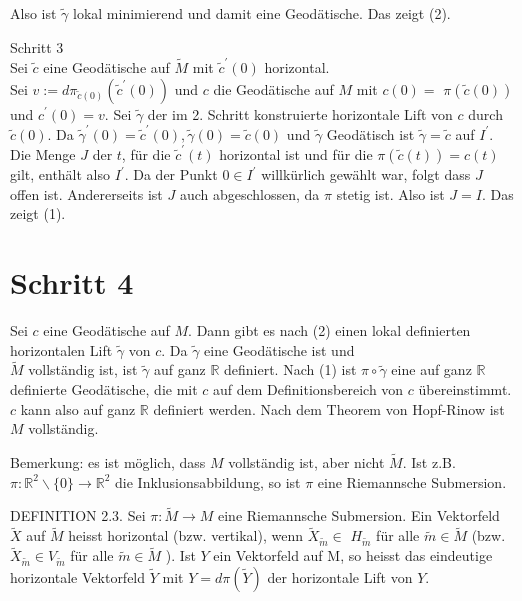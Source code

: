 \documentclass[10pt, letterpaper]{article}
\begin{document}
Also ist $\tilde{\gamma}$ lokal minimierend und damit eine Geodätische. Das zeigt (2).

Schritt 3\\
Sei $\tilde{c}$ eine Geodätische auf $\tilde{M}$ mit $\tilde{c}^{\prime}(0)$ horizontal.\\
Sei $v:=d \pi_{\tilde{c}(0)}\left(\tilde{c}^{\prime}(0)\right)$ und $c$ die Geodätische auf $M$ mit $c(0)=$ $\pi(\tilde{c}(0))$ und $c^{\prime}(0)=v$. Sei $\tilde{\gamma}$ der im 2. Schritt konstruierte horizontale Lift von $c$ durch $\tilde{c}(0)$. Da $\tilde{\gamma}^{\prime}(0)=\tilde{c}^{\prime}(0), \tilde{\gamma}(0)=\tilde{c}(0)$ und $\tilde{\gamma}$ Geodätisch ist $\tilde{\gamma}=\tilde{c}$ auf $I^{\prime}$. Die Menge $J$ der $t$, für die $\tilde{c}^{\prime}(t)$ horizontal ist und für die $\pi(\tilde{c}(t))=c(t)$ gilt, enthält also $I^{\prime}$. Da der Punkt $0 \in I^{\prime}$ willkürlich gewählt war, folgt dass $J$ offen ist. Andererseits ist $J$ auch abgeschlossen, da $\pi$ stetig ist. Also ist $J=I$. Das zeigt (1).

\section*{Schritt 4}
Sei $c$ eine Geodätische auf $M$. Dann gibt es nach (2) einen lokal definierten horizontalen Lift $\tilde{\gamma}$ von $c$. Da $\tilde{\gamma}$ eine Geodätische ist und\\
$\tilde{M}$ vollständig ist, ist $\tilde{\gamma}$ auf ganz $\mathbb{R}$ definiert. Nach (1) ist $\pi \circ \tilde{\gamma}$ eine auf ganz $\mathbb{R}$ definierte Geodätische, die mit $c$ auf dem Definitionsbereich von $c$ übereinstimmt. $c$ kann also auf ganz $\mathbb{R}$ definiert werden. Nach dem Theorem von Hopf-Rinow ist $M$ vollständig.

Bemerkung: es ist möglich, dass $M$ vollständig ist, aber nicht $\tilde{M}$. Ist z.B. $\pi: \mathbb{R}^{2} \backslash\{0\} \rightarrow \mathbb{R}^{2}$ die Inklusionsabbildung, so ist $\pi$ eine Riemannsche Submersion.

DEFINITION 2.3. Sei $\pi: \tilde{M} \rightarrow M$ eine Riemannsche Submersion. Ein Vektorfeld $\tilde{X}$ auf $\tilde{M}$ heisst horizontal (bzw. vertikal), wenn $\tilde{X}_{\tilde{m}} \in$ $H_{\tilde{m}}$ für alle $\tilde{m} \in \tilde{M}$ (bzw. $\tilde{X}_{\tilde{m}} \in V_{\tilde{m}}$ für alle $\tilde{m} \in \tilde{M}$ ). Ist $Y$ ein Vektorfeld auf M, so heisst das eindeutige horizontale Vektorfeld $\tilde{Y}$ mit $Y=d \pi(\tilde{Y})$ der horizontale Lift von $Y$.
\end{document}
